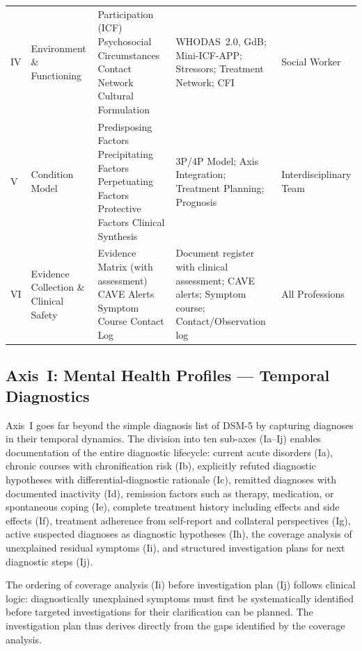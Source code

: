 \documentclass[11pt,a4paper]{article}
\begin{document}
\begin{longtable}{p{0.8cm}p{2.2cm}p{3.8cm}p{4cm}p{2cm}}
\addlinespace
IV & Environment \& Functioning & Participation (ICF) \newline Psychosocial Circumstances \newline Contact Network \newline Cultural Formulation & WHODAS~2.0, GdB; Mini-ICF-APP; Stressors; Treatment Network; CFI & Social Worker \\
\addlinespace
V & Condition Model & Predisposing Factors \newline Precipitating Factors \newline Perpetuating Factors \newline Protective Factors \newline Clinical Synthesis & 3P/4P Model; Axis Integration; Treatment Planning; Prognosis & Interdisciplinary Team \\
\addlinespace
VI & Evidence Collection \& Clinical Safety & Evidence Matrix (with assessment) \newline CAVE Alerts \newline Symptom Course \newline Contact Log & Document register with clinical assessment; CAVE alerts; Symptom course; Contact/Observation log & All Professions \\
\bottomrule
\end{longtable}

\subsection{Axis~I: Mental Health Profiles --- Temporal Diagnostics}
\label{sec:axis1}

Axis~I goes far beyond the simple diagnosis list of DSM-5 by capturing diagnoses in their temporal dynamics. The division into ten sub-axes (Ia--Ij) enables documentation of the entire diagnostic lifecycle: current acute disorders (Ia), chronic courses with chronification risk (Ib), explicitly refuted diagnostic hypotheses with differential-diagnostic rationale (Ic), remitted diagnoses with documented inactivity (Id), remission factors such as therapy, medication, or spontaneous coping (Ie), complete treatment history including effects and side effects (If), treatment adherence from self-report and collateral perspectives (Ig), active suspected diagnoses as diagnostic hypotheses (Ih), the coverage analysis of unexplained residual symptoms (Ii), and structured investigation plans for next diagnostic steps (Ij).

The ordering of coverage analysis (Ii) before investigation plan (Ij) follows clinical logic: diagnostically unexplained symptoms must first be systematically identified before targeted investigations for their clarification can be planned. The investigation plan thus derives directly from the gaps identified by the coverage analysis.
\end{document}
